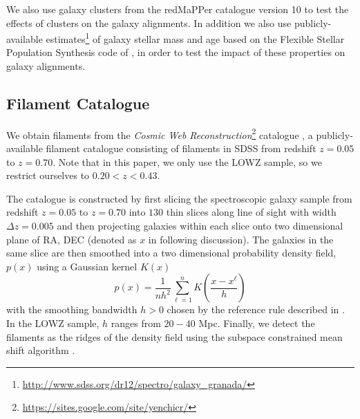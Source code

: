 \documentclass[usenatbib,useAMS]{mnras}
\theoremstyle{remark}
\newcommand{\sukhdeep}[1]{{\textcolor{magenta}{SS: #1}}}
\newcommand{\peter}[1]{{\textcolor{green}{PM: #1}}}
\newcommand{\rachel}[1]{{\textcolor{cyan}{RM: #1}}}
\begin{document}
			We also use galaxy clusters from the redMaPPer catalogue version 10
	        \citep{2014ApJ...783...80R,2014ApJ...785..104R,2015MNRAS.450..592R}  to test the effects
            of clusters on the galaxy alignments. 
	        In addition we also use publicly-available estimates\footnote{\url{http://www.sdss.org/dr12/spectro/galaxy_granada/}} of galaxy stellar mass and 
	        age based on the Flexible Stellar Population Synthesis code of \cite{2009ApJ...699..486C}, in order to test the impact of these properties on galaxy alignments.
	     

        \subsection{Filament Catalogue}	\label{sec::methods}
        We obtain filaments from
        the \emph{Cosmic Web Reconstruction}\footnote{\url{https://sites.google.com/site/yenchicr/}}
        catalogue 
        \citep{2016MNRAS.461.3896C},
        a publicly-available filament catalogue consisting of 
        filaments in SDSS from 
        redshift $z=0.05$ to $z=0.70$.
        Note that in this paper, we only use the LOWZ sample, so we restrict ourselves
        to $0.20<z<0.43$. 
        
        The catalogue is constructed by
        first slicing the spectroscopic galaxy sample from redshift $z=0.05$ to $z=0.70$
        into $130$ thin slices along line of sight with width $\Delta z=0.005$
        and then projecting galaxies within each slice onto two dimensional plane of RA, DEC (denoted as $x$ in following discussion). 
        The galaxies in the same slice are then smoothed into a two dimensional probability density field, $p(x)$
        using a Gaussian kernel $K(x)$
        \begin{equation}
        p(x) = \frac{1}{nh^2}\sum_{\ell=1}^n K\left(\frac{x-x^\ell}{h}\right)
	\end{equation}
        with the smoothing bandwidth $h>0$ chosen by the 
        reference rule described in \cite{2015MNRAS.454.1140C}.
        {{In the LOWZ sample, $h$ ranges from $20-40$ Mpc.}}
        Finally, we detect the filaments as the ridges of the density field \citep{2014arXiv1406.5663C}
        using the subspace constrained mean shift algorithm \citep{Ozertem2011}.
        
\end{document}
